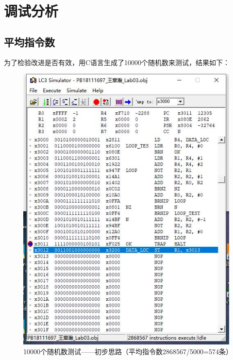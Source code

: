 \documentclass[UTF8]{article}
\begin{document}
	
	\section{调试分析}
	\subsection{平均指令数}
	为了检验改进是否有效，用C语言生成了10000个随机数来测试，结果如下：
	\begin{figure}[H]
		\begin{minipage}[H]{0.33\linewidth}
			\centering
			\includegraphics[scale=0.33]{data0_1.jpg}
			\caption{10000个随机数测试——初步思路（平均指令数2868567/5000=574条）}
			\label{data0_1}
		\end{minipage}
		\qquad
		\begin{minipage}[H]{0.33\linewidth}
			\centering

\end{minipage}
\end{figure}
\end{document}
